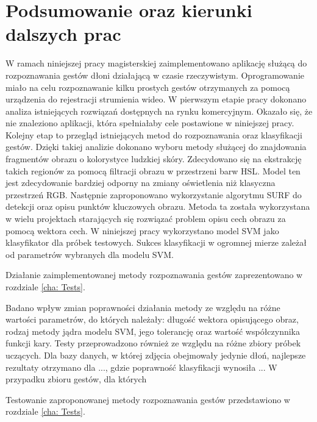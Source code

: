 \chapter{Podsumowanie oraz kierunki dalszych prac}
W ramach niniejszej pracy magisterskiej zaimplementowano aplikację służącą do rozpoznawania gestów dłoni działającą w czasie rzeczywistym. Oprogramowanie miało na celu rozpoznawanie kilku prostych gestów otrzymanych za pomocą urządzenia do rejestracji strumienia wideo. W pierwszym etapie pracy dokonano analiza istniejących rozwiązań dostępnych na rynku komercyjnym. Okazało się, że nie znaleziono aplikacji, która spełniałaby cele postawione w niniejszej pracy. Kolejny etap to przegląd istniejących metod do rozpoznawania oraz klasyfikacji gestów. Dzięki takiej analizie dokonano wyboru metody służącej do znajdowania fragmentów obrazu o kolorystyce ludzkiej skóry. Zdecydowano się na ekstrakcję takich regionów za pomocą filtracji obrazu w przestrzeni barw HSL. Model ten jest zdecydowanie bardziej odporny na zmiany oświetlenia niż klasyczna przestrzeń RGB. Następnie zaproponowano wykorzystanie algorytmu SURF do detekcji oraz opisu punktów kluczowych obrazu. Metoda ta została wykorzystana w wielu projektach starających się rozwiązać problem opisu cech obrazu za pomocą wektora cech. W niniejszej pracy wykorzystano model SVM jako klasyfikator dla próbek testowych. Sukces klasyfikacji w ogromnej mierze zależał od parametrów  wybranych dla modelu SVM.

Działanie zaimplementowanej metody rozpoznawania gestów zaprezentowano w rozdziale \ref{cha: Tests}. 

Badano wpływ zmian poprawności działania metody ze względu na różne wartości parametrów, do których należały: długość wektora opisującego obraz, rodzaj metody jądra modelu SVM, jego tolerancję oraz wartość współczynnika funkcji kary. Testy przeprowadzono również ze względu na różne zbiory próbek uczących. Dla bazy danych, w której zdjęcia obejmowały jedynie dłoń, najlepsze rezultaty otrzymano dla ..., gdzie poprawność klasyfikacji wynosiła ...  W przypadku zbioru gestów, dla których 

Testowanie zaproponowanej metody rozpoznawania gestów przedstawiono w rozdziale \ref{cha: Tests}. 

